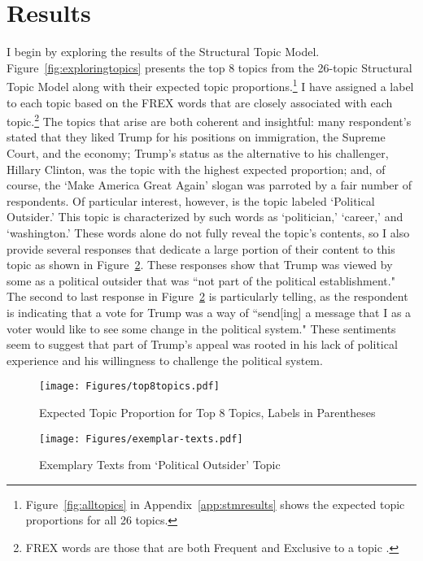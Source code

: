 \documentclass[12pt]{article}
\begin{document}
\section{Results}\label{sec:results}
I begin by exploring the results of the Structural Topic Model. Figure~\ref{fig:exploringtopics} presents the top 8 topics from the 26-topic Structural Topic Model along with their expected topic proportions.\footnote{Figure~\ref{fig:alltopics} in Appendix~\ref{app:stmresults} shows the expected topic proportions for all 26 topics.} I have assigned a label to each topic based on the FREX words that are closely associated with each topic.\footnote{FREX words are those that are both Frequent and Exclusive to a topic \parencite{bischof2012summarizing}.} The topics that arise are both coherent and insightful: many respondent's stated that they liked Trump for his positions on immigration, the Supreme Court, and the economy; Trump's status as the alternative to his challenger, Hillary Clinton, was the topic with the highest expected proportion; and, of course, the `Make America Great Again' slogan was parroted by a fair number of respondents. Of particular interest, however, is the topic labeled `Political Outsider.' This topic is characterized by such words as `politician,' `career,' and `washington.' These words alone do not fully reveal the topic's contents, so I also provide several responses that dedicate a large portion of their content to this topic as shown in Figure~\ref{fig:exemplar}. These responses show that Trump was viewed by some as a political outsider that was ``not part of the political establishment." The second to last response in Figure~\ref{fig:exemplar} is particularly telling, as the respondent is indicating that a vote for Trump was a way of ``send[ing] a message that I as a voter would like to see some change in the political system." These sentiments seem to suggest that part of Trump's appeal was rooted in his lack of political experience and his willingness to challenge the political system.

\begin{figure*}[t!]
	\centering
	\begin{subfigure}[b]{0.48\textwidth}
	\centering
	\texttt{[image: Figures/top8topics.pdf]}	
	\caption{{\small Expected Topic Proportion for Top 8 Topics, Labels in Parentheses}}\label{fig:top8}
	\end{subfigure}
	\hfil
	\begin{subfigure}[b]{0.48\textwidth}
		\centering
		\texttt{[image: Figures/exemplar-texts.pdf]}
		\caption{{\small Exemplary Texts from `Political Outsider' Topic}}\label{fig:exemplar}
	\end{subfigure}
	\caption{Exploring Topics from STM}\label{fig:exploringtopics}
	{\footnotesize }
\end{figure*}
\end{document}
